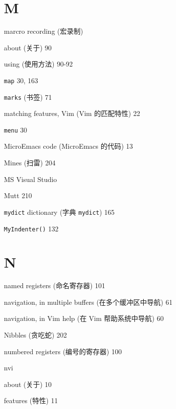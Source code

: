 \begin{multicols}{2}
\hangindent=3pc  \section*{M}

\hangindent=3pc  marcro recording (宏录制) \par
\hangindent=3pc \quad about (关于) 90 \par
\hangindent=3pc \quad using (使用方法) 90-92 \par

\hangindent=3pc  \texttt{map} 30, 163

\hangindent=3pc  \texttt{marks} (书签) 71

\hangindent=3pc  matching features, Vim (Vim 的匹配特性) 22

\hangindent=3pc  \texttt{menu} 30

\hangindent=3pc  MicroEmacs code (MicroEmacs 的代码) 13

\hangindent=3pc  Mines (扫雷) 204

\hangindent=3pc  MS Visual Studio

\hangindent=3pc  Mutt 210

\hangindent=3pc  \texttt{mydict} dictionary (字典 \texttt{mydict}) 165

\hangindent=3pc  \texttt{MyIndenter()} 132

\hangindent=3pc  \section*{N}

\hangindent=3pc  named registers (命名寄存器) 101

\hangindent=3pc  navigation, in multiple buffers (在多个缓冲区中导航) 61

\hangindent=3pc  navigation, in Vim help (在 Vim 帮助系统中导航) 60

\hangindent=3pc  Nibbles (贪吃蛇) 202

\hangindent=3pc  numbered registers (编号的寄存器) 100

\hangindent=3pc  nvi \par
\hangindent=3pc \quad about (关于) 10 \par
\hangindent=3pc \quad features (特性) 11 \par


\end{multicols}
